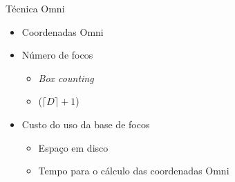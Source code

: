\documentclass{beamer}
\begin{document}
\begin{frame}{Técnica Omni}
  
  \begin{itemize}
    
   \item Coordenadas Omni \newline
   
   \item Número de focos
      \begin{itemize}
	\item \textit{Box counting}\newline
	\item ($\lceil D \rceil +1$) \newline
      \end{itemize}
   
    \item Custo do uso da base de focos
      \begin{itemize}
	\item Espaço em disco\newline
	\item Tempo para o cálculo das coordenadas Omni\newline
      \end{itemize}	
  \end{itemize}

 
\end{frame}
\end{document}
